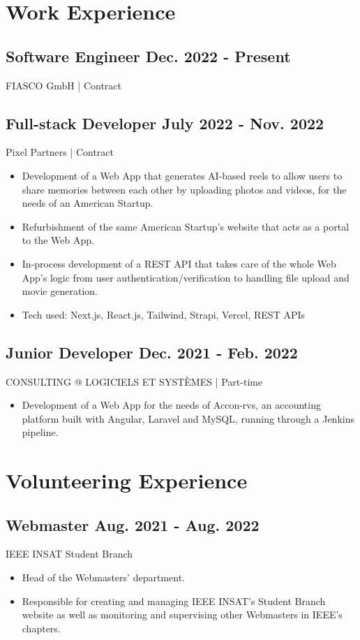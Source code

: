 \documentclass[a4,10pt]{article}
\newcommand{\subtext}[1]{
#1\par\vspace{-0.2cm}}
\newenvironment{zitemize}{
\begin{itemize}\itemsep0pt \parskip0pt \parsep1pt}
{\end{itemize}\vspace{-0.5cm}}
\begin{document}
\section{Work Experience}
\subsection*{ Software Engineer \hfill Dec. 2022 - Present} 
\subtext{FIASCO GmbH | Contract\hfill \hfill } 
    
\subsection*{ Full-stack Developer \hfill July 2022 - Nov. 2022 } 
\subtext{Pixel Partners | Contract\hfill } 
    \begin{zitemize}
        \item  Development of a Web App that generates AI-based reels to allow users to share memories between each other by uploading photos and videos, for the needs of an American Startup.
        \item  Refurbishment of the same American Startup's website that acts as a portal to the Web App.
         \item  In-process development of a REST API that takes care of the whole Web App's logic from user authentication/verification to handling file upload and movie generation.
          \item  Tech used: Next.js, React.js, Tailwind, Strapi, Vercel, REST APIs

    \end{zitemize}
\subsection*{ Junior Developer \hfill Dec. 2021 - Feb. 2022} 
\subtext{CONSULTING @ LOGICIELS ET SYSTÈMES | Part-time\hfill } 
    \begin{zitemize}
        \item  Development of a Web App for the needs of Accon-rvs, an accounting platform built with Angular, Laravel and MySQL, running through a Jenkins pipeline.
    \end{zitemize}
    


\section{Volunteering Experience}

\subsection*{Webmaster \hfill Aug. 2021 - Aug. 2022} 
\subtext{IEEE INSAT Student Branch\hfill } 
    \begin{zitemize}
        \item   Head of the Webmasters' department.
        \item  Responsible for creating and managing IEEE INSAT's Student Branch website as well as monitoring and supervising other Webmasters in IEEE's chapters.
                        

    \end{zitemize}
    
\end{document}
